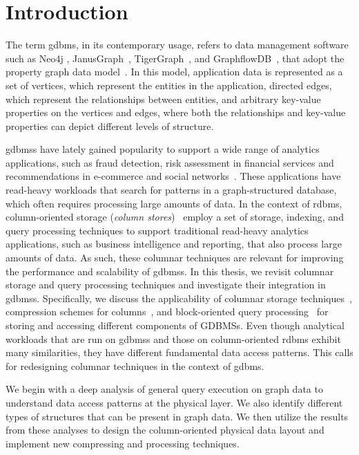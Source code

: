 
\chapter{Introduction}
\label{introduction}

The term \gls{gdbms}, in its contemporary usage, refers to data management software such as Neo4j \cite{neo4j}, JanusGraph~\cite{janusgraph}, TigerGraph~\cite{tigergraph}, and GraphflowDB~\cite{kankanamge:graphflow, mhedhbi:sqs}, that adopt the property graph data model~\cite{neo4j-property-graph-model}. In this model, application data is represented as a set of vertices, which represent the entities in the application, directed edges, which represent the relationships between entities, and arbitrary key-value properties on the vertices and edges, where both the relationships and key-value properties can depict different levels of structure.

\gls{gdbms}s have lately gained popularity to support a wide range of analytics applications, such as fraud detection, risk assessment in financial services and recommendations in e-commerce and social networks~\cite{sahu:survey}. These applications have read-heavy workloads that search for patterns in a graph-structured database, which often requires processing large amounts of data. In the context of \gls{rdbms}, column-oriented storage ({\em column stores})~\cite{monet-2decades, oracle-col, c-store, boncz-vectorwise} employ a set of storage, indexing, and query processing techniques to support traditional read-heavy analytics applications, such as business intelligence and reporting, that also process large amounts of data. As such, these columnar techniques are relevant for improving the performance and scalability of \gls{gdbms}s. In this thesis, we revisit columnar storage and query processing techniques and investigate their integration in \gls{gdbms}s. Specifically, we discuss the applicability of columnar storage techniques~\cite{c-store}, compression schemes for columns~\cite{abadi-col-comp, abadi-sparse-col, boncz-comp}, and block-oriented query processing~\cite{boncz-monet-vectorized, col-vs-row} for storing and accessing different components of GDBMSs. Even though analytical workloads that are run on \gls{gdbms}s and those on column-oriented \gls{rdbms} exhibit many similarities, they have different fundamental data access patterns. This calls for redesigning columnar techniques in the context of \gls{gdbms}.

We begin with a deep analysis of general query execution on graph data to understand data access patterns at the physical layer. We also identify different types of structures that can be present in graph data. We then utilize the results from these analyses to design the column-oriented physical data layout and implement new compressing and processing techniques. 


